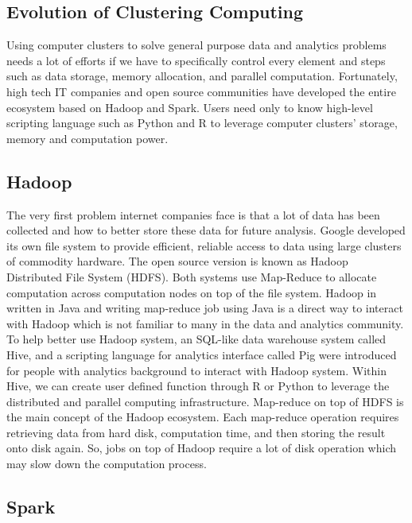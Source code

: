 \documentclass[12pt,]{krantz}
\theoremstyle{definition}
\theoremstyle{definition}
\theoremstyle{definition}
\theoremstyle{remark}
\begin{document}
\subsection{Evolution of Clustering
Computing}\label{evolution-of-clustering-computing}

Using computer clusters to solve general purpose data and analytics
problems needs a lot of efforts if we have to specifically control every
element and steps such as data storage, memory allocation, and parallel
computation. Fortunately, high tech IT companies and open source
communities have developed the entire ecosystem based on Hadoop and
Spark. Users need only to know high-level scripting language such as
Python and R to leverage computer clusters' storage, memory and
computation power.

\subsection{Hadoop}\label{hadoop}

The very first problem internet companies face is that a lot of data has
been collected and how to better store these data for future analysis.
Google developed its own file system to provide efficient, reliable
access to data using large clusters of commodity hardware. The open
source version is known as Hadoop Distributed File System (HDFS). Both
systems use Map-Reduce to allocate computation across computation nodes
on top of the file system. Hadoop in written in Java and writing
map-reduce job using Java is a direct way to interact with Hadoop which
is not familiar to many in the data and analytics community. To help
better use Hadoop system, an SQL-like data warehouse system called Hive,
and a scripting language for analytics interface called Pig were
introduced for people with analytics background to interact with Hadoop
system. Within Hive, we can create user defined function through R or
Python to leverage the distributed and parallel computing
infrastructure. Map-reduce on top of HDFS is the main concept of the
Hadoop ecosystem. Each map-reduce operation requires retrieving data
from hard disk, computation time, and then storing the result onto disk
again. So, jobs on top of Hadoop require a lot of disk operation which
may slow down the computation process.

\subsection{Spark}\label{spark}
\end{document}
